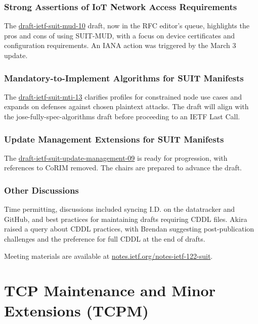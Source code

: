 \documentclass{article}
\begin{document}
\subsubsection{Strong Assertions of IoT Network Access Requirements}
The \href{https://datatracker.ietf.org/doc/html/draft-ietf-suit-mud-10}{draft-ietf-suit-mud-10} draft, now in the RFC editor's queue, highlights the pros and cons of using SUIT-MUD, with a focus on device certificates and configuration requirements. An IANA action was triggered by the March 3 update.

\subsubsection{Mandatory-to-Implement Algorithms for SUIT Manifests}
The \href{https://datatracker.ietf.org/doc/html/draft-ietf-suit-mti-13}{draft-ietf-suit-mti-13} clarifies profiles for constrained node use cases and expands on defenses against chosen plaintext attacks. The draft will align with the jose-fully-spec-algorithms draft before proceeding to an IETF Last Call.

\subsubsection{Update Management Extensions for SUIT Manifests}
The \href{https://datatracker.ietf.org/doc/html/draft-ietf-suit-update-management-09}{draft-ietf-suit-update-management-09} is ready for progression, with references to CoRIM removed. The chairs are prepared to advance the draft.

\subsubsection{Other Discussions}
Time permitting, discussions included syncing I.D. on the datatracker and GitHub, and best practices for maintaining drafts requiring CDDL files. Akira raised a query about CDDL practices, with Brendan suggesting post-publication challenges and the preference for full CDDL at the end of drafts.

Meeting materials are available at \href{https://notes.ietf.org/notes-ietf-122-suit}{notes.ietf.org/notes-ietf-122-suit}.



\newpage

\section{TCP Maintenance and Minor Extensions (TCPM)}
\end{document}
